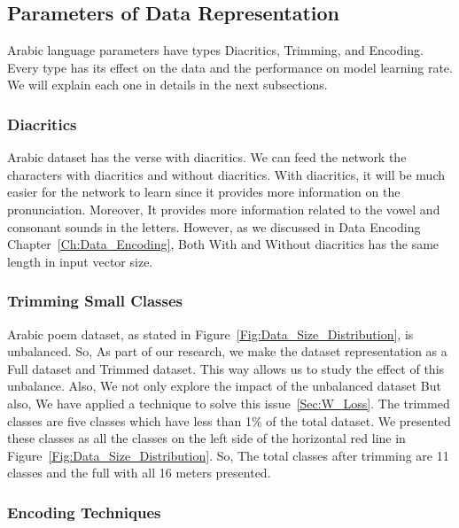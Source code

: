 \subsection{Parameters of Data Representation}\label{Sec:Data_Rep_Param}

Arabic language parameters have types Diacritics, Trimming, and Encoding. Every type has its effect on the data and the performance on model learning rate. We will explain each one in details in the next subsections.

\subsubsection{Diacritics}

Arabic dataset has the verse with diacritics. We can feed the network the characters with diacritics and without diacritics. With diacritics, it will be much easier for the network to learn since it provides more information on the pronunciation. Moreover, It provides more information related to the vowel and consonant sounds in the letters. However, as we discussed in Data Encoding Chapter~\ref{Ch:Data_Encoding}, Both With and Without diacritics has the same length in input vector size.

\subsubsection{Trimming Small Classes}

Arabic poem dataset, as stated in Figure~\ref{Fig:Data_Size_Distribution}, is unbalanced. So, As part of our research, we make the dataset representation as a Full dataset and Trimmed dataset. This way allows us to study the effect of this unbalance. Also, We not only explore the impact of the unbalanced dataset But also, We have applied a technique to solve this issue~\ref{Sec:W_Loss}. The trimmed classes are five classes which have less than 1\% of the total dataset. We presented these classes as all the classes on the left side of the horizontal red line in Figure~\ref{Fig:Data_Size_Distribution}. So, The total classes after trimming are 11 classes and the full with all 16 meters presented.

\subsubsection{Encoding Techniques}

